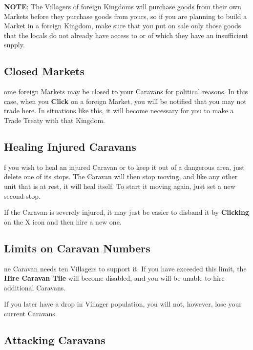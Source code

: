 \textbf{NOTE}: The Villagers of foreign Kingdoms will purchase goods from their own Markets before they purchase goods from yours, so if you are planning to build a Market in a foreign Kingdom, make sure that you put on sale only those goods that the locals do not already have access to or of which they have an insufficient supply.

\subsection{\textsf{Closed Markets}}


ome foreign Markets may be closed to your Caravans for political reasons. In this case, when you \textbf{Click} on a foreign Market, you will be notified that you may not trade here. In situations like this, it will become necessary for you to make a Trade Treaty with that Kingdom.

\subsection{\textsf{Healing Injured Caravans}}


f you wish to heal an injured Caravan or to keep it out of a dangerous area, just delete one of its stops. The Caravan will then stop moving, and like any other unit that is at rest, it will heal itself. To start it moving again, just set a new second stop.

If the Caravan is severely injured, it may just be easier to disband it by \textbf{Clicking} on the X icon and then hire a new one.

\subsection{\textsf{Limits on Caravan Numbers}}


ne Caravan needs ten Villagers to support it. If you have exceeded this limit, the \textbf{Hire Caravan Tile} will become disabled, and you will be unable to hire additional Caravans.

If you later have a drop in Villager population, you will not, however, lose your current Caravans.

\subsection{\textsf{Attacking Caravans}}

